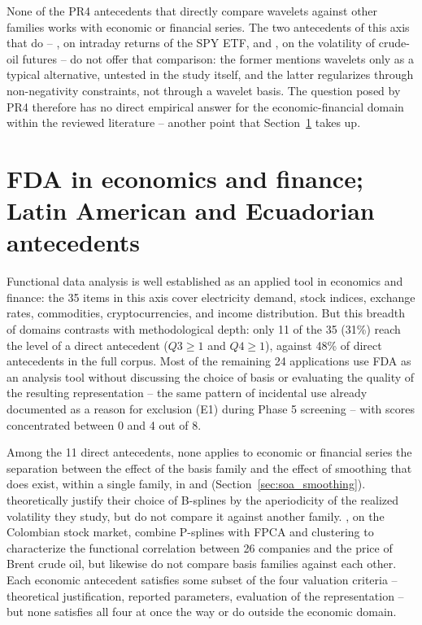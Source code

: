 None of the PR4 antecedents that directly compare wavelets against other
families works with economic or financial series. The two antecedents
of this axis that do -- \cite{aue_generalized_2017}, on intraday returns
of the SPY ETF, and \cite{rice_exploring_2023}, on the volatility of
crude-oil futures -- do not offer that comparison: the former mentions
wavelets only as a typical alternative, untested in the study itself,
and the latter regularizes through non-negativity constraints, not
through a wavelet basis. The question posed by PR4 therefore has no
direct empirical answer for the economic-financial domain within the
reviewed literature -- another point that Section~\ref{sec:soa_economics}
takes up.

\section{FDA in economics and finance; Latin American and Ecuadorian
antecedents}
\label{sec:soa_economics}

Functional data analysis is well established as an applied tool in
economics and finance: the 35 items in this axis cover electricity
demand, stock indices, exchange rates, commodities, cryptocurrencies,
and income distribution. But this breadth of domains contrasts with
methodological depth: only 11 of the 35 (31\%) reach the level of a
direct antecedent ($Q3\geq1$ and $Q4\geq1$), against 48\% of direct
antecedents in the full corpus. Most of the remaining 24 applications
use FDA as an analysis tool without discussing the choice of basis or
evaluating the quality of the resulting representation -- the same
pattern of incidental use already documented as a reason for exclusion
(E1) during Phase 5 screening -- with scores concentrated between 0 and
4 out of 8.

Among the 11 direct antecedents, none applies to economic or financial
series the separation between the effect of the basis family and the
effect of smoothing that does exist, within a single family, in
\cite{aguilera_comparative_2013} and \cite{gao_factor_2024}
(Section~\ref{sec:soa_smoothing}). \cite{shackleton_comparing_2024}
theoretically justify their choice of B-splines by the aperiodicity of
the realized volatility they study, but do not compare it against
another family. \cite{rodriguezcuadro_study_2025}, on the Colombian
stock market, combine P-splines with FPCA and clustering to
characterize the functional correlation between 26 companies and the
price of Brent crude oil, but likewise do not compare basis families
against each other. Each economic antecedent satisfies some subset of
the four valuation criteria -- theoretical justification, reported
parameters, evaluation of the representation -- but none satisfies all
four at once the way \cite{beyaztas_comparison_2022} or
\cite{aguilera_comparative_2013} do outside the economic domain.

